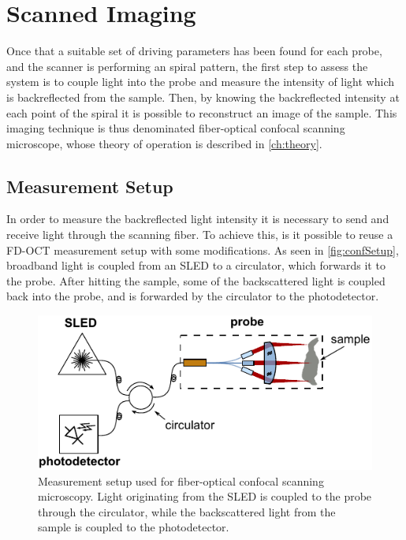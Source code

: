 \section{Scanned Imaging}

Once that a suitable set of driving parameters has been found for each probe, and the scanner is performing an spiral pattern, the first step to assess the system is to couple light into the probe and measure the intensity of light which is backreflected from the sample. Then, by knowing the backreflected intensity at each point of the spiral it is possible to reconstruct an image of the sample. This imaging technique is thus denominated fiber-optical confocal scanning microscope, whose theory of operation is described in \autoref{ch:theory}.

\subsection{Measurement Setup}
In order to measure the backreflected light intensity it is necessary to send and receive light through the scanning fiber. To achieve this, is it possible to reuse a FD-OCT measurement setup with some modifications. As seen in \autoref{fig:confSetup}, broadband light is coupled from an SLED to a circulator, which forwards it to the probe. After hitting the sample, some of the backscattered light is coupled back into the probe, and is forwarded by the circulator to the photodetector.

\begin{figure}[h!]\centering \includegraphics[width=12cm]{figures/50_Measurements/conf/setup/confSetup.pdf}
      \caption{Measurement setup used for fiber-optical confocal scanning microscopy. Light originating from the SLED is coupled to the probe through the circulator, while the backscattered light from the sample is coupled to the photodetector.}
      \label{fig:confSetup}
\end{figure}

